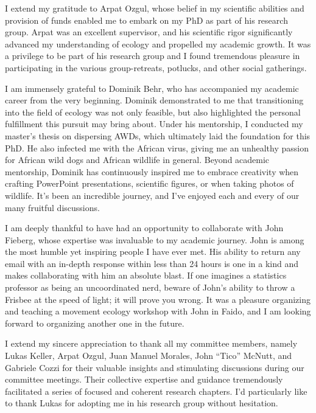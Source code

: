 \documentclass[../FinalThesis.tex]{subfiles}
\begin{document}
I extend my gratitude to Arpat Ozgul, whose belief in my scientific abilities
and provision of funds enabled me to embark on my PhD as part of his research
group. Arpat was an excellent supervisor, and his scientific rigor significantly
advanced my understanding of ecology and propelled my academic growth. It was a
privilege to be part of his research group and I found tremendous pleasure in
participating in the various group-retreats, potlucks, and other social
gatherings.

I am immensely grateful to Dominik Behr, who has accompanied my academic career
from the very beginning. Dominik demonstrated to me that transitioning into the
field of ecology was not only feasible, but also highlighted the personal
fulfillment this pursuit may bring about. Under his mentorship, I conducted my
master's thesis on dispersing AWDs, which ultimately laid the foundation for
this PhD. He also infected me with the African virus, giving me an unhealthy
passion for African wild dogs and African wildlife in general. Beyond academic
mentorship, Dominik has continuously inspired me to embrace creativity when
crafting PowerPoint presentations, scientific figures, or when taking photos of
wildlife. It's been an incredible journey, and I've enjoyed each and every of
our many fruitful discussions.

I am deeply thankful to have had an opportunity to collaborate with John
Fieberg, whose expertise was invaluable to my academic journey. John is among
the most humble yet inspiring people I have ever met. His ability to return any
email with an in-depth response within less than 24 hours is one in a kind and
makes collaborating with him an absolute blast. If one imagines a statistics
professor as being an uncoordinated nerd, beware of John's ability to throw a
Frisbee at the speed of light; it will prove you wrong. It was a pleasure
organizing and teaching a movement ecology workshop with John in Faido, and I am
looking forward to organizing another one in the future.

I extend my sincere appreciation to thank all my committee members, namely Lukas
Keller, Arpat Ozgul, Juan Manuel Morales, John ``Tico'' McNutt, and Gabriele
Cozzi for their valuable insights and stimulating discussions during our
committee meetings. Their collective expertise and guidance tremendously
facilitated a series of focused and coherent research chapters. I'd particularly
like to thank Lukas for adopting me in his research group without hesitation.
\end{document}
